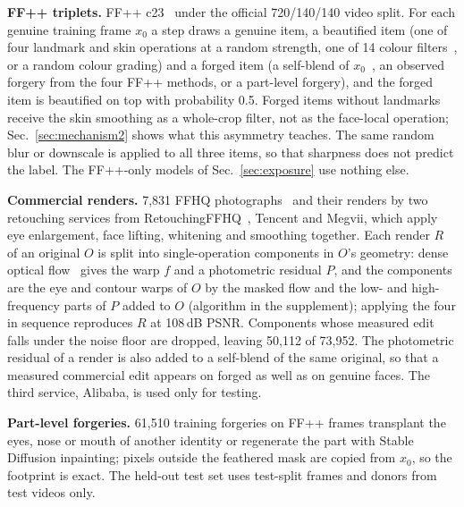 \documentclass[conference]{IEEEtran}
\begin{document}
\textbf{FF++ triplets.} FF++ c23~\cite{ffpp} under the official 720/140/140 video split. For each genuine training frame
$x_0$ a step draws a genuine item, a beautified item (one of four landmark and skin operations at a random strength, one
of 14 colour filters~\cite{pilgram}, or a random colour grading) and a forged item (a self-blend of $x_0$~\cite{sbi}, an
observed forgery from the four FF++ methods, or a part-level forgery), and the forged item is beautified on top with
probability 0.5. Forged items without landmarks receive the skin smoothing as a whole-crop filter, not as the face-local
operation; Sec.~\ref{sec:mechanism2} shows what this asymmetry teaches. The same random blur or downscale is applied to all three items, so that sharpness does
not predict the label. The FF++-only models of Sec.~\ref{sec:exposure} use nothing else.

\textbf{Commercial renders.} 7,831 FFHQ photographs~\cite{ffhq} and their renders by two retouching services from
RetouchingFFHQ~\cite{retouchingffhq}, Tencent and Megvii, which apply eye enlargement, face lifting, whitening and
smoothing together. Each render $R$ of an original $O$ is split into single-operation components in $O$'s geometry:
dense optical flow~\cite{dis} gives the warp $f$ and a photometric residual $P$, and the components are the eye and
contour warps of $O$ by the masked flow and the low- and high-frequency parts of $P$ added to $O$ (algorithm in the
supplement); applying the four in sequence reproduces $R$ at 108\,dB PSNR. Components whose measured edit falls under the noise floor are dropped, leaving 50,112 of 73,952. The
photometric residual of a render is also added to a self-blend of the same original, so that a measured commercial edit
appears on forged as well as on genuine faces. The third service, Alibaba, is used only for testing.

\textbf{Part-level forgeries.} 61,510 training forgeries on FF++ frames transplant the eyes, nose or mouth of another
identity or regenerate the part with Stable Diffusion inpainting; pixels outside the feathered mask are copied from
$x_0$, so the footprint is exact. The held-out test set uses test-split frames and donors from test videos only.
\end{document}
